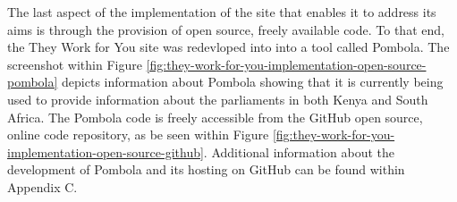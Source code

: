 The last aspect of the implementation of the site that enables it to address its aims is through the provision of open source, freely available code.
To that end, the They Work for You site was redevloped into into a tool called Pombola.
The screenshot within Figure \ref{fig:they-work-for-you-implementation-open-source-pombola} depicts information about Pombola showing that it is currently being used to provide information about the parliaments in both Kenya and South Africa.
The Pombola code \cite{mysociety-github} is freely accessible from the GitHub \cite{github} open source, online code repository, as be seen within Figure \ref{fig:they-work-for-you-implementation-open-source-github}.
Additional information about the development of Pombola and its hosting on GitHub can be found within Appendix C.
